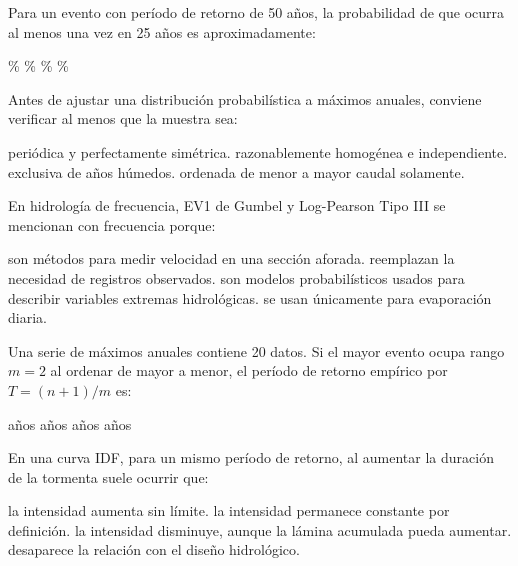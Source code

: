 \question [5] Para un evento con período de retorno de 50 años, la probabilidad de que ocurra al menos una vez en 25 años es aproximadamente:
\begin{choices}
\%
\%
\%
\%
\end{choices}

\question [5] Antes de ajustar una distribución probabilística a máximos anuales, conviene verificar al menos que la muestra sea:
\begin{choices}
\choice periódica y perfectamente simétrica.
\CorrectChoice razonablemente homogénea e independiente.
\choice exclusiva de años húmedos.
\choice ordenada de menor a mayor caudal solamente.
\end{choices}

\question [5] En hidrología de frecuencia, EV1 de Gumbel y Log-Pearson Tipo III se mencionan con frecuencia porque:
\begin{choices}
\choice son métodos para medir velocidad en una sección aforada.
\choice reemplazan la necesidad de registros observados.
\CorrectChoice son modelos probabilísticos usados para describir variables extremas hidrológicas.
\choice se usan únicamente para evaporación diaria.
\end{choices}

\question [5] Una serie de máximos anuales contiene 20 datos. Si el mayor evento ocupa rango \(m=2\) al ordenar de mayor a menor, el período de retorno empírico por \(T = (n+1)/m\) es:
\begin{choices}
 años
 años
 años
 años
\end{choices}

\question [4] En una curva IDF, para un mismo período de retorno, al aumentar la duración de la tormenta suele ocurrir que:
\begin{choices}
\choice la intensidad aumenta sin límite.
\choice la intensidad permanece constante por definición.
\CorrectChoice la intensidad disminuye, aunque la lámina acumulada pueda aumentar.
\choice desaparece la relación con el diseño hidrológico.
\end{choices}
